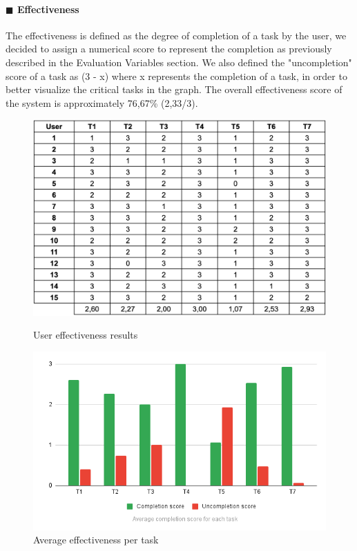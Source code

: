 \documentclass[11pt]{article} %
\begin{document}
\paragraph{$\blacksquare$ Effectiveness}
The effectiveness is defined as the degree of completion of a task by the user, we decided to assign a numerical score to represent the completion as previously described in the Evaluation Variables section.
We also defined the "uncompletion" score of a task as (3 - x) where x represents the completion of a task, in order to better visualize the critical tasks in the graph. 
The overall effectiveness score of the system is approximately 76,67\% (2,33/3).
\begin{figure}[ht]
  \centering
  \begin{minipage}[b]{0.48\textwidth}
    \includegraphics[width=\textwidth]{Images/table1.png}
    \caption{User effectiveness results}
  \end{minipage}
  \hfill
  \begin{minipage}[b]{0.48\textwidth}
    \includegraphics[width=\textwidth]{Images/Eff.png}
    \caption{Average effectiveness per task}
  \end{minipage}
\end{figure}
\end{document}
